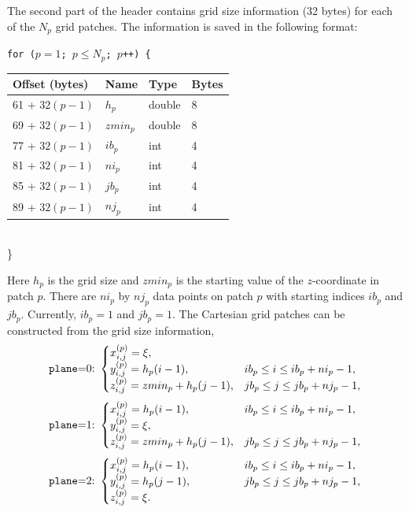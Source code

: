 \documentclass[11pt]{report}
\begin{document}
The second part of the header contains grid size information (32 bytes)
for each of the $N_p$ grid patches. The information is saved in the following format:
{\samepage
\begin{flushleft}
{\tt for ($p=1$; $p\leq N_p$; $p$++) \{}\nopagebreak \\ 
\hspace{5mm}
\begin{tabular}{llll}\hline
Offset (bytes) & Name & Type & Bytes \\ \hline
61 + $32(p - 1)$ & $h_{p}$ & double & 8 \\ \hline
69 + $32(p - 1)$ & $zmin_{p}$ & double & 8 \\ \hline
77 + $32(p - 1)$ & $ib_{p}$ & int & 4 \\ \hline
81 + $32(p - 1)$ & $ni_{p}$ & int & 4 \\ \hline
85 + $32(p - 1)$ & $jb_{p}$ & int & 4 \\ \hline
89 + $32(p - 1)$ & $nj_{p}$ & int & 4 \\ \hline
\end{tabular}\\
\}
\end{flushleft}
}
Here $h_p$ is the grid size and $zmin_p$ is the starting value of the $z$-coordinate in patch
$p$. There are $ni_p$ by $nj_p$ data points on patch $p$ with starting indices $ib_p$ and
$jb_p$. Currently, $ib_p=1$ and $jb_p=1$. The Cartesian grid patches can be constructed from the
grid size information,
\[
\mbox{{\tt plane}=0:}\ \begin{cases}
x^{(p)}_{i,j} = \xi,\\
y^{(p)}_{i,j} = h_p(i-1),& ib_p\leq i\leq ib_p+ni_p-1,\\
z^{(p)}_{i,j} = zmin_p + h_p(j-1),& jb_p\leq j\leq jb_p+nj_p-1,
\end{cases}
\]
\[
\mbox{{\tt plane}=1:}\ \begin{cases}
x^{(p)}_{i,j} = h_p(i-1),& ib_p\leq i\leq ib_p+ni_p-1,\\
y^{(p)}_{i,j} = \xi,\\
z^{(p)}_{i,j} = zmin_p + h_p(j-1),& jb_p\leq j\leq jb_p+nj_p-1,
\end{cases}
\]
\[
\mbox{{\tt plane}=2:}\ \begin{cases}
x^{(p)}_{i,j} = h_p(i-1),& \qquad \qquad ib_p\leq i\leq ib_p+ni_p-1, \\
y^{(p)}_{i,j} = h_p(j-1),& \qquad \qquad jb_p\leq j\leq jb_p+nj_p-1, \\
z^{(p)}_{i,j} = \xi.
\end{cases}
\]
\end{document}
